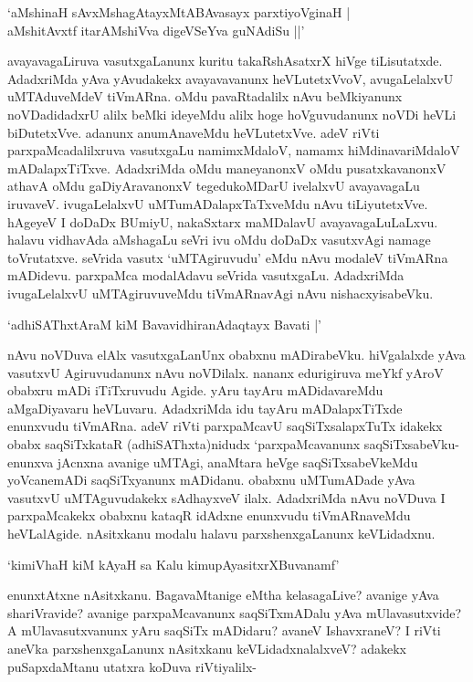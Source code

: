 \begin{shloka}
`aMshinaH sAvxMshagAtayxMtABAvasayx parxtiyoVginaH |\\
aMshitAvxtf itarAMshiVva digeVSeYva guNAdiSu ||'
\end{shloka}

avayavagaLiruva vasutxgaLanunx kuritu takaRshAsatxrX hiVge tiLisutatxde. AdadxriMda yAva yAvudakekx avayavavanunx heVLutetxVvoV, avugaLelalxvU uMTAduveMdeV tiVmARna. oMdu pavaRtadalilx nAvu beMkiyanunx noVDadidadxrU alilx beMki ideyeMdu alilx hoge hoVguvudanunx noVDi heVLi biDutetxVve. adanunx anumAnaveMdu heVLutetxVve. adeV riVti parxpaMcadalilxruva vasutxgaLu namimxMdaloV, namamx hiMdinavariMdaloV mADalapxTiTxve. AdadxriMda oMdu maneyanonxV oMdu pusatxkavanonxV athavA oMdu gaDiyAravanonxV tegedukoMDarU ivelalxvU avayavagaLu iruvaveV. ivugaLelalxvU uMTumADalapxTaTxveMdu nAvu tiLiyutetxVve. hAgeyeV I doDaDx BUmiyU, nakaSxtarx maMDalavU avayavagaLuLaLxvu. halavu vidhavAda aMshagaLu seVri ivu oMdu doDaDx vasutxvAgi namage toVrutatxve. seVrida vasutx `uMTAgiruvudu' eMdu nAvu modaleV tiVmARna mADidevu. parxpaMca modalAdavu seVrida vasutxgaLu. AdadxriMda ivugaLelalxvU uMTAgiruvuveMdu tiVmARnavAgi nAvu nishacxyisabeVku.

\begin{shloka}
`adhiSAThxtAraM kiM BavavidhiranAdaqtayx Bavati |'
\end{shloka}

nAvu noVDuva elAlx vasutxgaLanUnx obabxnu mADirabeVku. hiVgalalxde yAva vasutxvU Agiruvudanunx nAvu noVDilalx. nananx edurigiruva meYkf yAroV obabxru mADi iTiTxruvudu Agide. yAru tayAru mADidavareMdu aMgaDiyavaru heVLuvaru. AdadxriMda idu tayAru mADalapxTiTxde enunxvudu tiVmARna. adeV riVti parxpaMcavU saqSiTxsalapxTuTx idakekx obabx saqSiTxkataR (adhiSAThxta)nidudx `parxpaMcavanunx saqSiTxsabeVku- enunxva jAcnxna avanige uMTAgi, anaMtara heVge saqSiTxsabeVkeMdu yoVcanemADi saqSiTxyanunx mADidanu. obabxnu uMTumADade yAva vasutxvU uMTAguvudakekx sAdhayxveV ilalx. AdadxriMda nAvu noVDuva I parxpaMcakekx obabxnu kataqR idAdxne enunxvudu tiVmARnaveMdu heVLalAgide. nAsitxkanu modalu halavu parxshenxgaLanunx keVLidadxnu.

\begin{shloka}
`kimiVhaH kiM kAyaH sa Kalu kimupAyasitxrXBuvanamf'
\end{shloka}

enunxtAtxne nAsitxkanu. BagavaMtanige eMtha kelasagaLive? avanige yAva shariVravide? avanige parxpaMcavanunx saqSiTxmADalu yAva mUlavasutxvide? A mUlavasutxvanunx yAru saqSiTx mADidaru? avaneV IshavxraneV? I riVti aneVka parxshenxgaLanunx nAsitxkanu keVLidadxnalalxveV? adakekx puSapxdaMtanu utatxra koDuva riVtiyalilx-

